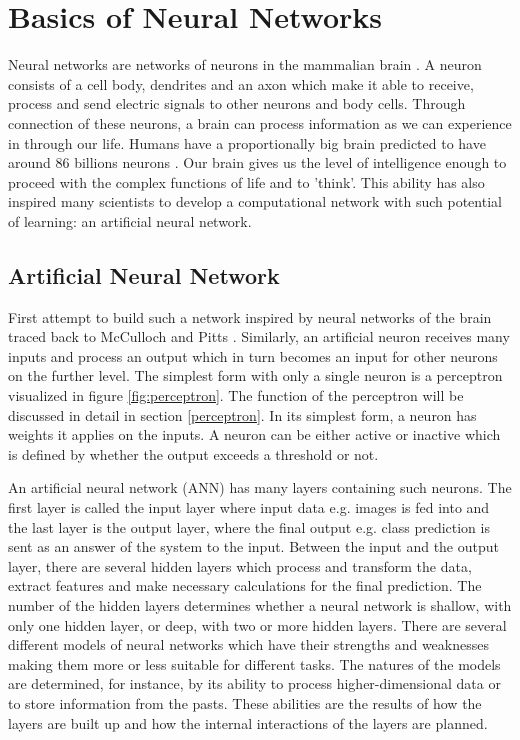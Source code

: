 \chapter{Basics of Neural Networks} \label{ch:neuronalNetwork}
Neural networks are networks of neurons in the mammalian brain \cite{ann}. A neuron consists of a cell body, dendrites and an axon which make it able to receive, process and send electric signals to other neurons and body cells. Through connection of these neurons, a brain can process information as we can experience in through our life. Humans have a proportionally big brain predicted to have around 86 billions neurons \cite{neurons}. Our brain gives us the level of intelligence enough to proceed with the complex functions of life and to 'think'. This ability has also inspired many scientists to develop a computational network with such potential of learning: an artificial neural network. 

\section{Artificial Neural Network} \label{sec:ann}
First attempt to build such a network inspired by neural networks of the brain traced back to McCulloch and Pitts \cite{McandPitts}. Similarly, an artificial neuron receives many inputs and process an output which in turn becomes an input for other neurons on the further level. The simplest form with only a single neuron is a perceptron visualized in figure \ref{fig:perceptron}. The function of the perceptron will be discussed in detail in section \ref{perceptron}. In its simplest form, a neuron has weights it applies on the inputs. A neuron can be either active or inactive which is defined by whether the output exceeds a threshold or not. 


An artificial neural network (ANN) has many layers containing such neurons. The first layer is called the input layer where input data e.g. images is fed into and the last layer is the output layer, where the final output e.g. class prediction is sent as an answer of the system to the input. Between the input and the output layer, there are several hidden layers which process and transform the data, extract features and make necessary calculations for the final prediction. The number of the hidden layers determines whether a neural network is shallow, with only one hidden layer, or deep, with two or more hidden layers. There are several different models of neural networks which have their strengths and weaknesses making them more or less suitable for different tasks. The natures of the models are determined, for instance, by its ability to process higher-dimensional data or to store information from the pasts. These abilities are the results of how the layers are built up and how the internal interactions of the layers are planned.

